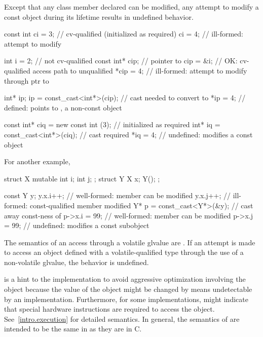 \pnum
{}%
Except that any class member declared 
can be modified, any attempt to modify a const object during its
lifetime results in undefined behavior.
\begin{example}
\begin{codeblock}
const int ci = 3;                       // cv-qualified (initialized as required)
ci = 4;                                 // ill-formed: attempt to modify 

int i = 2;                              // not cv-qualified
const int* cip;                         // pointer to 
cip = &i;                               // OK: cv-qualified access path to unqualified
*cip = 4;                               // ill-formed: attempt to modify through ptr to 

int* ip;
ip = const_cast<int*>(cip);             // cast needed to convert  to 
*ip = 4;                                // defined:  points to , a non-const object

const int* ciq = new const int (3);     // initialized as required
int* iq = const_cast<int*>(ciq);        // cast required
*iq = 4;                                // undefined: modifies a const object
\end{codeblock}
For another example,
\begin{codeblock}
struct X {
  mutable int i;
  int j;
};
struct Y {
  X x;
  Y();
};

const Y y;
y.x.i++;                                // well-formed:  member can be modified
y.x.j++;                                // ill-formed: const-qualified member modified
Y* p = const_cast<Y*>(&y);              // cast away const-ness of 
p->x.i = 99;                            // well-formed:  member can be modified
p->x.j = 99;                            // undefined: modifies a const subobject
\end{codeblock}
\end{example}

\pnum
The semantics of an access through a volatile glvalue are
.
If an attempt is made to access an object defined with a
volatile-qualified type through the use of a non-volatile glvalue,
the behavior is undefined.

\pnum
{}%
%
\begin{note}
 is a hint to the implementation to avoid aggressive
optimization involving the object because the value of the object might
be changed by means undetectable by an implementation.
Furthermore, for some implementations,  might indicate that
special hardware instructions are required to access the object.
See~\ref{intro.execution} for detailed semantics. In general, the
semantics of  are intended to be the same in \Cpp{} as
they are in C.
\end{note}

